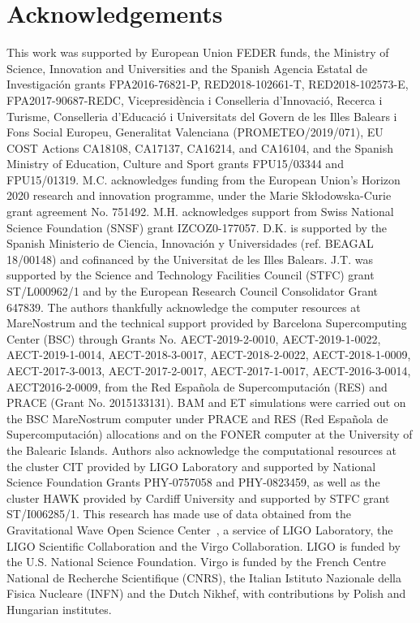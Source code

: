 \documentclass[%
aps,
prd,
amssymb,
amsmath,
amsfonts,
eqsecnum,
showpacs,
nofootinbib,
floatfix,
twocolumn,
twoside,
a4paper,
superscriptaddress
]{revtex4-1}
\begin{document}
\section*{Acknowledgements}

This work was supported by European Union FEDER funds, the Ministry of Science, 
Innovation and Universities and the Spanish Agencia Estatal de Investigación grants FPA2016-76821-P,        %
RED2018-102661-T,    %
RED2018-102573-E,    %
FPA2017-90687-REDC,  %
%
Vicepresid\`encia i Conselleria d’Innovació, Recerca i Turisme, Conselleria d’Educació i Universitats del Govern de les Illes Balears i Fons Social Europeu, 
%
Generalitat Valenciana (PROMETEO/2019/071),  
%
EU COST Actions CA18108, CA17137, CA16214, and CA16104, and
the Spanish Ministry of Education, Culture and Sport grants FPU15/03344 and FPU15/01319.
%
M.C. acknowledges funding from the European Union's Horizon 2020 research and innovation programme, under the Marie Skłodowska-Curie grant agreement No. 751492.
%
M.H. acknowledges support from Swiss National Science Foundation (SNSF) grant IZCOZ0-177057.
%
D.K. is supported by the Spanish Ministerio de Ciencia, Innovaci{\'o}n y
Universidades (ref. BEAGAL 18/00148)
and cofinanced by the Universitat de les Illes Balears.
%
J.T. was supported by the Science and Technology Facilities Council (STFC) grant ST/L000962/1 and by the European Research Council Consolidator Grant 647839.
%
The authors thankfully acknowledge the computer resources at MareNostrum and the technical support provided by Barcelona Supercomputing Center (BSC) through Grants No. AECT-2019-2-0010, AECT-2019-1-0022, AECT-2019-1-0014, AECT-2018-3-0017, AECT-2018-2-0022, AECT-2018-1-0009, AECT-2017-3-0013, AECT-2017-2-0017, AECT-2017-1-0017, AECT-2016-3-0014, AECT2016-2-0009,  from the Red Española de Supercomputación (RES) and PRACE (Grant No. 2015133131). BAM and ET simulations were carried out on the BSC MareNostrum computer under PRACE and RES (Red Española de Supercomputación) allocations and on the FONER computer at the University of the Balearic Islands. 
%
Authors also acknowledge the computational resources at the cluster CIT provided by LIGO Laboratory and supported by National Science Foundation Grants PHY-0757058 and PHY-0823459, as well as the cluster HAWK provided by Cardiff University and supported by STFC grant ST/I006285/1.
%
This research has made use of data obtained from the Gravitational Wave Open Science Center~\cite{GWOSC}, a service of LIGO Laboratory, the LIGO Scientific Collaboration and the Virgo Collaboration. LIGO is funded by the U.S. National Science Foundation. Virgo is funded by the French Centre National de Recherche Scientifique (CNRS), the Italian Istituto Nazionale della Fisica Nucleare (INFN) and the Dutch Nikhef, with contributions by Polish and Hungarian institutes.
\end{document}

